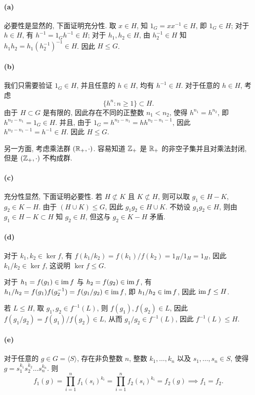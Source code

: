 \documentclass{article}
\begin{document}
\begin{solution}
	\paragraph{(a)} 必要性是显然的, 下面证明充分性. 取 $x \in H$, 知 $1_G = xx^{-1} \in H$, 即 $1_G \in H$; 对于 $h\in H$, 有 $h^{-1} = 1_G h^{-1} \in H$; 对于 $h_1,h_2\in H$, 由 $h_2^{-1}\in H$ 知 $h_1h_2 = h_1(h_2^{-1})^{-1} \in H$. 因此 $H \le G$.

	\paragraph{(b)} 我们只需要验证 $1_G \in H$, 并且任意的 $h\in H$, 均有 $h^{-1} \in H$. 对于任意的 $h\in H$, 考虑 
	\[\{h^{n}: n \ge 1\} \subset H.\]
	由于 $H \subset G$ 是有限的, 因此存在不同的正整数 $n_1<n_2$, 使得 $h^{n_1} = h^{n_2}$, 即 $h^{n_2-n_1} = 1_G \in H$. 
	并且, 由于 $1_G = h^{n_2-n_1} = hh^{n_2-n_1-1}$, 因此 $h^{n_2-n_1-1} = h^{-1} \in H$.
	因此 $H \le G$.

	另一方面, 考虑乘法群 $(\mathbb{R}_+,\cdot)$. 容易知道 $\mathbb{Z}_+$ 是 $\mathbb{R}_+$ 的非空子集并且对乘法封闭, 但是 $(\mathbb{Z}_+,\cdot)$ 不构成群.

	\paragraph{(c)} 充分性显然, 下面证明必要性. 若 $H\not\subset K$ 且 $K\not\subset H$, 则可以取 $g_1 \in H-K$, $g_2 \in K-H$. 由于 $(H \cup K) \le G$, 因此 $g_1g_2 \in H\cup K$. 不妨设 $g_1g_2 \in H$, 则由 $g_1\in H-K\subset H$ 知 $g_2 \in H$, 但这与 $g_2 \in K-H$ 矛盾.
	
	\paragraph{(d)} 对于 $k_1,k_2 \in\ker f$, 有 $f(k_1/k_2) = f(k_1)/f(k_2) = 1_H/1_H = 1_H$, 因此 $k_1/k_2 \in\ker f$, 这说明 $\ker f \le G$. 

	对于 $h_1=f(g_1)\in \operatorname{im} f$ 与 $h_2 = f(g_2) \in \operatorname{im} f$, 有 $h_1/h_2 = f(g_1) f(g_2^{-1}) = f(g_1/g_2) \in \operatorname{im} f$, 即 $h_1/h_2 \in \operatorname{im} f$, 因此 $\operatorname{im} f \le H$. 

	若 $L \le H$, 取 $g_1,g_2 \in f^{-1}(L)$, 则 $f(g_1),f(g_2) \in L$, 因此 $f(g_1/g_2) = f(g_1)/f(g_2) \in L$, 从而 $g_1/g_2 \in f^{-1}(L)$, 因此 $f^{-1}(L) \le H$.

	\paragraph{(e)} 对于任意的 $g\in G = \langle S \rangle$, 存在非负整数 $n$, 整数 $k_1,\dots,k_n$ 以及 $s_1,\dots,s_n \in S$, 使得 $g = s_1^{k_1}s_2^{k_2} \dots s_n^{k_n}$. 则
	\[ f_1(g) = \prod_{i=1}^{n}f_1(s_i)^{k_i} = \prod_{i=1}^{n}f_2(s_i)^{k_i} = f_2(g)
	\implies f_1 = f_2. \]
\end{solution}
\end{document}
